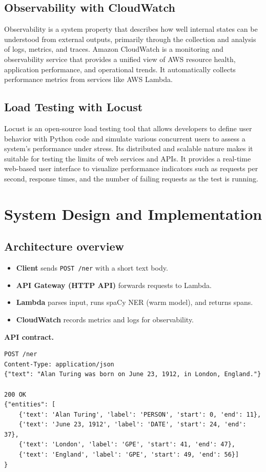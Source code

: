 \documentclass[11pt,a4paper]{article}
\begin{document}
\subsection{Observability with CloudWatch}
Observability is a system property that describes how well internal states can be understood from external outputs, primarily through the collection and analysis of logs, metrics, and traces. Amazon CloudWatch is a monitoring and observability service that provides a unified view of AWS resource health, application performance, and operational trends. It automatically collects performance metrics from services like AWS Lambda.

\subsection{Load Testing with Locust}
Locust is an open-source load testing tool that allows developers to define user behavior with Python code and simulate various concurrent users to assess a system's performance under stress. Its distributed and scalable nature makes it suitable for testing the limits of web services and APIs. It provides a real-time web-based user interface to visualize performance indicators such as requests per second, response times, and the number of failing requests as the test is running.

\section{System Design and Implementation}
\subsection{Architecture overview}
\begin{itemize}[leftmargin=1.3em]
  \item \textbf{Client} sends \texttt{POST /ner} with a short text body.
  \item \textbf{API Gateway (HTTP API)} forwards requests to Lambda.
  \item \textbf{Lambda} parses input, runs spaCy NER (warm model), and returns spans.
  \item \textbf{CloudWatch} records metrics and logs for observability.
\end{itemize}

\noindent\textbf{API contract.}
\begin{verbatim}
POST /ner
Content-Type: application/json
{"text": "Alan Turing was born on June 23, 1912, in London, England."}

200 OK
{"entities": [
    {'text': 'Alan Turing', 'label': 'PERSON', 'start': 0, 'end': 11},
    {'text': 'June 23, 1912', 'label': 'DATE', 'start': 24, 'end': 37},
    {'text': 'London', 'label': 'GPE', 'start': 41, 'end': 47},
    {'text': 'England', 'label': 'GPE', 'start': 49, 'end': 56}]
}
\end{verbatim}
\end{document}
